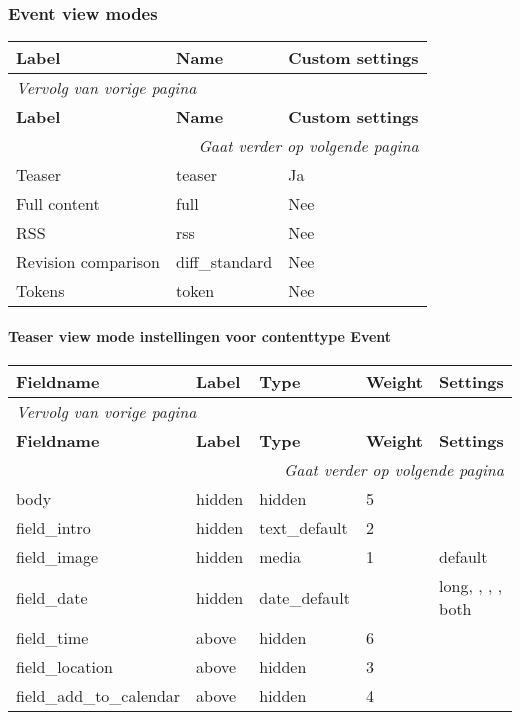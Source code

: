 \subsubsection{Event view modes}
  \begin{longtable}{| p{5.00cm}|p{5.00cm}|p{5.00cm}|}
  \hline
  \rowcolor{tableheader}
  \textbf{Label} & \textbf{Name} & \textbf{Custom settings}  \tabularnewline
  \hline
\endfirsthead
\multicolumn{3}{l}{\textit{Vervolg van vorige pagina}} \\
\hline
\rowcolor{tableheader}
  \textbf{Label} & \textbf{Name} & \textbf{Custom settings}  \tabularnewline
  \hline
\hline
\endhead
\multicolumn{3}{r}{\textit{Gaat verder op volgende pagina}} \\
\endfoot
\hline
\endlastfoot
  Teaser & teaser & Ja  \tabularnewline
  \hline
  Full content & full & Nee  \tabularnewline
  \hline
  RSS & rss & Nee  \tabularnewline
  \hline
  Revision comparison & diff\_standard & Nee  \tabularnewline
  \hline
  Tokens & token & Nee  \tabularnewline
  \hline
  \end{longtable}

\paragraph{Teaser view mode instellingen voor contenttype Event }

  \begin{longtable}{| p{3.00cm}|p{3.00cm}|p{3.00cm}|p{3.00cm}|p{3.00cm}|}
  \hline
  \rowcolor{tableheader}
  \textbf{Fieldname} & \textbf{Label} & \textbf{Type} & \textbf{Weight} & \textbf{Settings}  \tabularnewline
  \hline
\endfirsthead
\multicolumn{5}{l}{\textit{Vervolg van vorige pagina}} \\
\hline
\rowcolor{tableheader}
  \textbf{Fieldname} & \textbf{Label} & \textbf{Type} & \textbf{Weight} & \textbf{Settings}  \tabularnewline
  \hline
\hline
\endhead
\multicolumn{5}{r}{\textit{Gaat verder op volgende pagina}} \\
\endfoot
\hline
\endlastfoot
  body & hidden & hidden & 5 &    \tabularnewline
  \hline
  field\_intro & hidden & text\_default & 2 &    \tabularnewline
  \hline
  field\_image & hidden & media & 1 & default  \tabularnewline
  \hline
  field\_date & hidden & date\_default &   & long, , , , both  \tabularnewline
  \hline
  field\_time & above & hidden & 6 &    \tabularnewline
  \hline
  field\_location & above & hidden & 3 &    \tabularnewline
  \hline
  field\_add\_to\_calendar & above & hidden & 4 &    \tabularnewline
  \hline
  \end{longtable}

